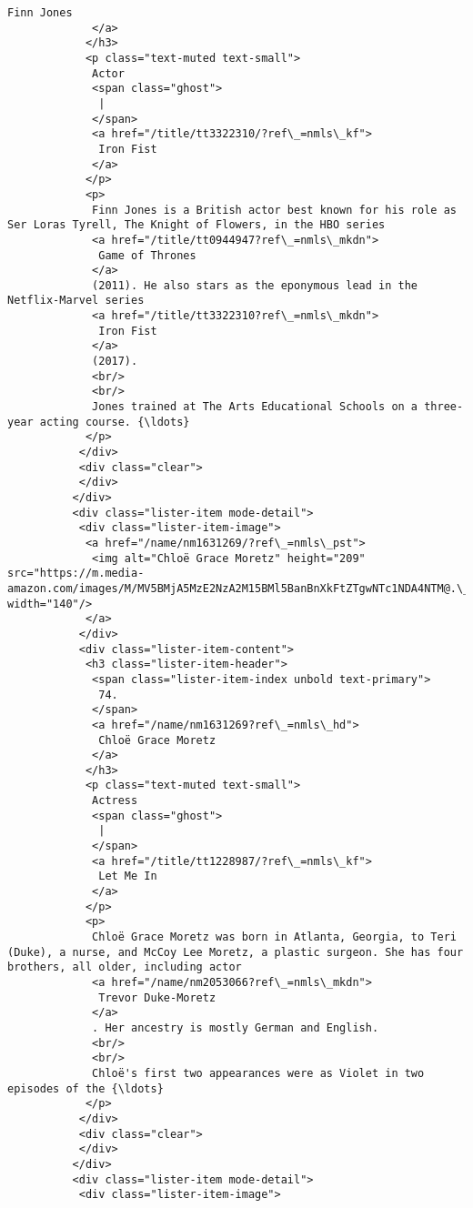 \documentclass[11pt]{article}
\begin{document}
\begin{Verbatim}[commandchars=\\\{\}]
              Finn Jones
             </a>
            </h3>
            <p class="text-muted text-small">
             Actor
             <span class="ghost">
              |
             </span>
             <a href="/title/tt3322310/?ref\_=nmls\_kf">
              Iron Fist
             </a>
            </p>
            <p>
             Finn Jones is a British actor best known for his role as Ser Loras Tyrell, The Knight of Flowers, in the HBO series
             <a href="/title/tt0944947?ref\_=nmls\_mkdn">
              Game of Thrones
             </a>
             (2011). He also stars as the eponymous lead in the Netflix-Marvel series
             <a href="/title/tt3322310?ref\_=nmls\_mkdn">
              Iron Fist
             </a>
             (2017).
             <br/>
             <br/>
             Jones trained at The Arts Educational Schools on a three-year acting course. {\ldots}
            </p>
           </div>
           <div class="clear">
           </div>
          </div>
          <div class="lister-item mode-detail">
           <div class="lister-item-image">
            <a href="/name/nm1631269/?ref\_=nmls\_pst">
             <img alt="Chloë Grace Moretz" height="209" src="https://m.media-amazon.com/images/M/MV5BMjA5MzE2NzA2M15BMl5BanBnXkFtZTgwNTc1NDA4NTM@.\_V1\_UY209\_CR25,0,140,209\_AL\_.jpg" width="140"/>
            </a>
           </div>
           <div class="lister-item-content">
            <h3 class="lister-item-header">
             <span class="lister-item-index unbold text-primary">
              74.
             </span>
             <a href="/name/nm1631269?ref\_=nmls\_hd">
              Chloë Grace Moretz
             </a>
            </h3>
            <p class="text-muted text-small">
             Actress
             <span class="ghost">
              |
             </span>
             <a href="/title/tt1228987/?ref\_=nmls\_kf">
              Let Me In
             </a>
            </p>
            <p>
             Chloë Grace Moretz was born in Atlanta, Georgia, to Teri (Duke), a nurse, and McCoy Lee Moretz, a plastic surgeon. She has four brothers, all older, including actor
             <a href="/name/nm2053066?ref\_=nmls\_mkdn">
              Trevor Duke-Moretz
             </a>
             . Her ancestry is mostly German and English.
             <br/>
             <br/>
             Chloë's first two appearances were as Violet in two episodes of the {\ldots}
            </p>
           </div>
           <div class="clear">
           </div>
          </div>
          <div class="lister-item mode-detail">
           <div class="lister-item-image">

\end{Verbatim}
\end{document}
